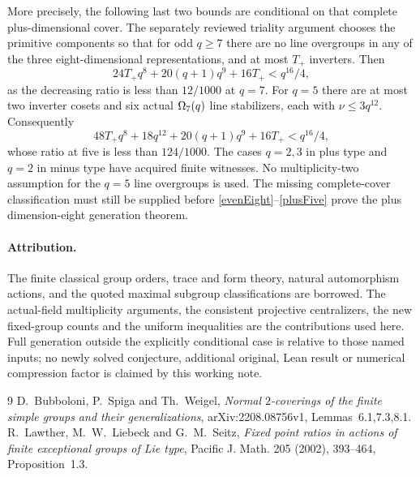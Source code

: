 \documentclass[11pt,a4paper]{article}
\begin{document}
More precisely, the following last two bounds are conditional on
that complete plus-dimensional cover. The separately reviewed triality
argument chooses the primitive components so that for odd $q\ge7$
there are no line overgroups in any of the three eight-dimensional
representations, and at most $T_+$ inverters. Then
\begin{equation}\label{plusEight}
 24T_+q^8+20(q+1)q^9+16T_+<q^{16}/4,
\end{equation}
as the decreasing ratio is less than $12/1000$ at $q=7$.
For $q=5$ there are at most two inverter cosets and six actual
$\Omega_7(q)$ line stabilizers, each with $\nu\le3q^{12}$.
Consequently
\begin{equation}\label{plusFive}
 48T_+q^8+18q^{12}+20(q+1)q^9+16T_+<q^{16}/4,
\end{equation}
whose ratio at five is less than $124/1000$.
The cases $q=2,3$ in plus type and $q=2$ in minus type have acquired
finite witnesses. No multiplicity-two assumption for the $q=5$ line
overgroups is used. The missing complete-cover classification must
still be supplied before \eqref{evenEight}--\eqref{plusFive} prove the plus dimension-eight
generation theorem.

\paragraph{Attribution.}
The finite classical group orders, trace and form theory, natural
automorphism actions, and the quoted maximal subgroup classifications
are borrowed. The actual-field multiplicity arguments, the consistent
projective centralizers, the new fixed-group counts and the uniform
inequalities are the contributions used here. Full generation outside
the explicitly conditional case is relative to those named inputs;
no newly solved conjecture, additional original, Lean result or numerical
compression factor is claimed by this working note.

\begin{thebibliography}{9}
 D.~Bubboloni, P.~Spiga and Th.~Weigel,
\emph{Normal $2$-coverings of the finite simple groups and their
generalizations}, arXiv:2208.08756v1, Lemmas~6.1,7.3,8.1.
 R.~Lawther, M.~W.~Liebeck and G.~M.~Seitz,
\emph{Fixed point ratios in actions of finite exceptional groups of Lie type},
Pacific J. Math. 205 (2002), 393--464, Proposition~1.3.
\end{thebibliography}
\end{document}
